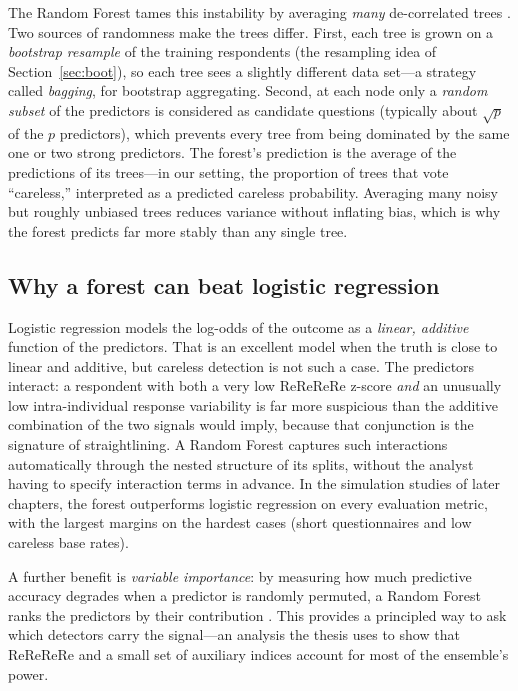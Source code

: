 The Random Forest tames this instability by averaging \emph{many}
de-correlated trees \parencite{breiman2001random}. Two sources of randomness
make the trees differ. First, each tree is grown on a \emph{bootstrap resample}
of the training respondents (the resampling idea of Section~\ref{sec:boot}),
so each tree sees a slightly different data set---a strategy called
\emph{bagging}, for bootstrap aggregating. Second, at each node only a
\emph{random subset} of the predictors is considered as candidate questions
(typically about $\sqrt{p}$ of the $p$ predictors), which prevents every tree
from being dominated by the same one or two strong predictors. The forest's
prediction is the average of the predictions of its trees---in our setting, the
proportion of trees that vote ``careless,'' interpreted as a predicted careless
probability. Averaging many noisy but roughly unbiased trees reduces variance
without inflating bias, which is why the forest predicts far more stably than any
single tree.

\subsection{Why a forest can beat logistic regression}

Logistic regression models the log-odds of the outcome as a \emph{linear,
additive} function of the predictors. That is an excellent model when the truth
is close to linear and additive, but careless detection is not such a case. The
predictors interact: a respondent with both a very low ReReReRe z-score
\emph{and} an unusually low intra-individual response variability is far more
suspicious than the additive combination of the two signals would imply, because
that conjunction is the signature of straightlining. A Random Forest captures
such interactions automatically through the nested structure of its splits,
without the analyst having to specify interaction terms in advance. In the
simulation studies of later chapters, the forest outperforms logistic regression
on every evaluation metric, with the largest margins on the hardest cases (short
questionnaires and low careless base rates).

A further benefit is \emph{variable importance}: by measuring how much
predictive accuracy degrades when a predictor is randomly permuted, a Random
Forest ranks the predictors by their contribution \parencite{strobl2008conditional}.
This provides a principled way to ask which detectors carry the signal---an
analysis the thesis uses to show that ReReReRe and a small set of auxiliary
indices account for most of the ensemble's power.

